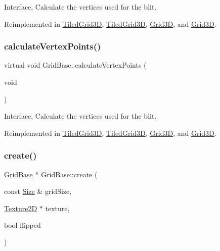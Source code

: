 Interface, Calculate the vertices used for the blit. 

Reimplemented in \hyperlink{classTiledGrid3D_a0ae62db952e86b1f609e0ab3665947ca}{Tiled\+Grid3D}, \hyperlink{classTiledGrid3D_a852fcee20d027566f129e9707b7f4a62}{Tiled\+Grid3D}, \hyperlink{classGrid3D_a062df8e14b99c36b71ff391b57de22fe}{Grid3D}, and \hyperlink{classGrid3D_a6b2a8e963e37df0c9deddb34f7c3a1ae}{Grid3D}.

\mbox{\label{classGridBase_af0a2a35a7ded95f2be589301019717a0}} 
\subsubsection{\texorpdfstring{calculate\+Vertex\+Points()}{calculateVertexPoints()}\hspace{0.1cm}{\footnotesize\ttfamily [2/2]}}
{\footnotesize\ttfamily virtual void Grid\+Base\+::calculate\+Vertex\+Points (\begin{DoxyParamCaption}\item[{void}]{ }\end{DoxyParamCaption})\hspace{0.3cm}{\ttfamily [virtual]}}

Interface, Calculate the vertices used for the blit. 

Reimplemented in \hyperlink{classTiledGrid3D_a0ae62db952e86b1f609e0ab3665947ca}{Tiled\+Grid3D}, \hyperlink{classTiledGrid3D_a852fcee20d027566f129e9707b7f4a62}{Tiled\+Grid3D}, \hyperlink{classGrid3D_a062df8e14b99c36b71ff391b57de22fe}{Grid3D}, and \hyperlink{classGrid3D_a6b2a8e963e37df0c9deddb34f7c3a1ae}{Grid3D}.

\mbox{\label{classGridBase_ad95df596c6e3b0c2b89bd5b6bf47f179}} 
\subsubsection{\texorpdfstring{create()}{create()}\hspace{0.1cm}{\footnotesize\ttfamily [1/4]}}
{\footnotesize\ttfamily \hyperlink{classGridBase}{Grid\+Base} $\ast$ Grid\+Base\+::create (\begin{DoxyParamCaption}\item[{const \hyperlink{classSize}{Size} \&}]{grid\+Size,  }\item[{\hyperlink{classTexture2D}{Texture2D} $\ast$}]{texture,  }\item[{bool}]{flipped }\end{DoxyParamCaption})\hspace{0.3cm}{\ttfamily [static]}}

